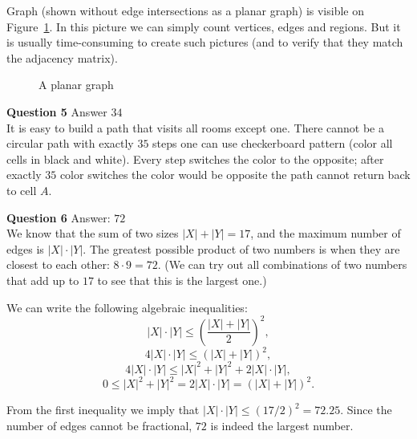 \documentclass[jou]{apa6}
\begin{document}
Graph (shown without edge intersections as a planar graph) is visible 
on Figure~\ref{fig:question4-graph}. In this picture we can simply count 
vertices, edges and regions. But it is usually time-consuming to 
create such pictures (and to verify that they match the adjacency matrix).

\begin{figure}[!htb]
\caption{\label{fig:question4-graph} A planar graph}
\end{figure}


\vspace{10pt}
{\bf Question 5} Answer $34$\\
It is easy to build a path that visits all rooms except one. 
There cannot be a circular path with exactly $35$ steps \textendash{}
one can use checkerboard pattern (color all cells in black and white). 
Every step switches the color to the opposite; after exactly $35$ color switches
the color would be opposite \textendash{} the path cannot return back to cell $A$.


\vspace{10pt}
{\bf Question 6} Answer: $72$\\
We know that the sum of two sizes $|X| + |Y| = 17$, 
and the maximum number of edges is $|X| \cdot |Y|$. 
The greatest possible product of two numbers is
when they are closest to each other: 
$8 \cdot 9 = 72$. (We can try out all combinations of two numbers
that add up to $17$ to see that this is the largest one.)

We can write the following algebraic inequalities: 
$$|X| \cdot |Y| \leq \left( \frac{|X| + |Y|}{2} \right)^2,$$
$$4 |X| \cdot |Y| \leq \left( |X| + |Y| \right)^2,$$
$$4 |X| \cdot |Y| \leq |X|^2 + |Y|^2 + 2 |X| \cdot |Y|,$$
$$0 \leq |X|^2 + |Y|^2 = 2 |X| \cdot |Y| = (|X| + |Y|)^2.$$

From the first inequality we imply that $|X| \cdot |Y| \leq (17/2)^2 = 72.25$. 
Since the number of edges cannot be fractional, $72$ is indeed the largest number.
\end{document}
